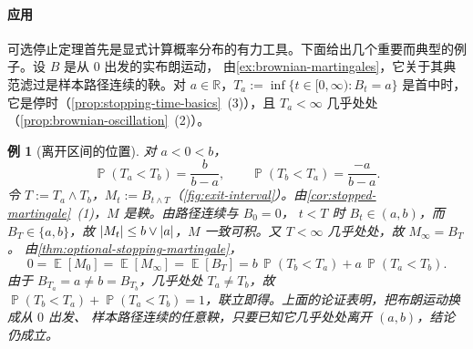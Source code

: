 \documentclass[UTF8,11pt,a4paper,oneside,fontset=fandol]{ctexrep}
\numberwithin{equation}{section}
\theoremstyle{zhthm}
\newtheorem{example}[theorem]{例}
\newcommand{\R}{\mathbb{R}}
\DeclareMathOperator{\Prob}{\mathbb{P}}
\DeclareMathOperator{\E}{\mathbb{E}}
\DeclarePairedDelimiter{\abs}{\lvert}{\rvert}
\begin{document}
\paragraph{应用}
可选停止定理首先是显式计算概率分布的有力工具。下面给出几个重要而典型的例子。设 $B$ 是从 $0$ 出发的实布朗运动，
由\cref{ex:brownian-martingales}，它关于其典范滤过是样本路径连续的鞅。对 $a\in\R$，$T_a:=\inf\{t\in[0,\infty):B_t=a\}$ 是首中时，
它是停时（\cref{prop:stopping-time-basics}~(3)），且 $T_a<\infty$ 几乎处处（\cref{prop:brownian-oscillation}~(2)）。

\begin{example}[离开区间的位置]
\label{ex:exit-point-interval}
对 $a<0<b$，
\[
  \Prob(T_a<T_b)=\frac{b}{b-a},\qquad \Prob(T_b<T_a)=\frac{-a}{b-a}.
\]
令 $T:=T_a\wedge T_b$，$M_t:=B_{t\wedge T}$（\cref{fig:exit-interval}）。由\cref{cor:stopped-martingale}~(1)，$M$ 是鞅。由路径连续与 $B_0=0$，
$t<T$ 时 $B_t\in(a,b)$，而 $B_T\in\{a,b\}$，故 $\abs{M_t}\le b\vee\abs a$，$M$ 一致可积。又 $T<\infty$ 几乎处处，故 $M_\infty=B_T$。
由\cref{thm:optional-stopping-martingale}，
\[
  0=\E[M_0]=\E[M_\infty]=\E[B_T]=b\,\Prob(T_b<T_a)+a\,\Prob(T_a<T_b).
\]
由于 $B_{T_a}=a\ne b=B_{T_b}$，几乎处处 $T_a\ne T_b$，故 $\Prob(T_b<T_a)+\Prob(T_a<T_b)=1$，联立即得。上面的论证表明，把布朗运动换成从 $0$ 出发、
样本路径连续的任意鞅，只要已知它几乎处处离开 $(a,b)$，结论仍成立。
\end{example}
\end{document}

